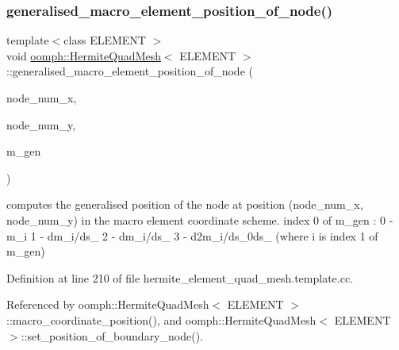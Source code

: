 \subsubsection{\texorpdfstring{generalised\+\_\+macro\+\_\+element\+\_\+position\+\_\+of\+\_\+node()}{generalised\_macro\_element\_position\_of\_node()}}
{\footnotesize\ttfamily template$<$class E\+L\+E\+M\+E\+NT $>$ \\
void \hyperlink{classoomph_1_1HermiteQuadMesh}{oomph\+::\+Hermite\+Quad\+Mesh}$<$ E\+L\+E\+M\+E\+NT $>$\+::generalised\+\_\+macro\+\_\+element\+\_\+position\+\_\+of\+\_\+node (\begin{DoxyParamCaption}\item[{const unsigned \&}]{node\+\_\+num\+\_\+x,  }\item[{const unsigned \&}]{node\+\_\+num\+\_\+y,  }\item[{\hyperlink{classoomph_1_1DenseMatrix}{Dense\+Matrix}$<$ double $>$ \&}]{m\+\_\+gen }\end{DoxyParamCaption})\hspace{0.3cm}{\ttfamily [private]}}



computes the generalised position of the node at position (node\+\_\+num\+\_\+x, node\+\_\+num\+\_\+y) in the macro element coordinate scheme. index 0 of m\+\_\+gen \+: 0 -\/ m\+\_\+i 1 -\/ dm\+\_\+i/ds\+\_ 2 -\/ dm\+\_\+i/ds\+\_ 3 -\/ d2m\+\_\+i/ds\+\_\+0ds\+\_ (where i is index 1 of m\+\_\+gen) 



Definition at line 210 of file hermite\+\_\+element\+\_\+quad\+\_\+mesh.\+template.\+cc.



Referenced by oomph\+::\+Hermite\+Quad\+Mesh$<$ E\+L\+E\+M\+E\+N\+T $>$\+::macro\+\_\+coordinate\+\_\+position(), and oomph\+::\+Hermite\+Quad\+Mesh$<$ E\+L\+E\+M\+E\+N\+T $>$\+::set\+\_\+position\+\_\+of\+\_\+boundary\+\_\+node().

\mbox{\label{classoomph_1_1HermiteQuadMesh_a745a06530e60580e95826bedcf2e3e01}} 

